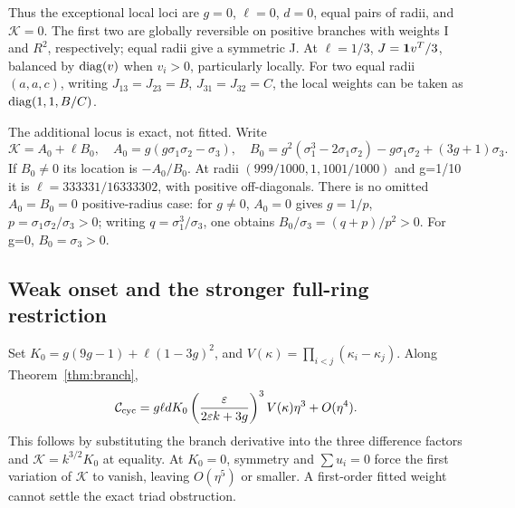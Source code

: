 Thus the exceptional local loci are \(g=0\), \(\ell=0\), \(d=0\), equal pairs of radii, and \(\mathcal K=0\). The first two are globally reversible on positive branches with weights I and \(R^2\), respectively; equal radii give a symmetric J. At \(\ell=1/3\), \(J=\mathbf1 v^T/3\), balanced by \(\operatorname{diag}(v)\) when \(v_i>0\), particularly locally. For two equal radii \((a,a,c)\), writing \(J_{13}=J_{23}=B\), \(J_{31}=J_{32}=C\), the local weights can be taken as \(\operatorname{diag}(1,1,B/C)\).

The additional locus is exact, not fitted. Write
\[
\mathcal K=A_0+\ell B_0,\quad A_0=g(g\sigma_1\sigma_2-\sigma_3),\quad
B_0=g^2(\sigma_1^3-2\sigma_1\sigma_2)-g\sigma_1\sigma_2+(3g+1)\sigma_3.
\]
If \(B_0\ne0\) its location is \(-A_0/B_0\). At radii \((999/1000,1,1001/1000)\) and g=1/10 it is \(\ell=333331/16333302\), with positive off-diagonals. There is no omitted \(A_0=B_0=0\) positive-radius case: for \(g\ne0\), \(A_0=0\) gives \(g=1/p\), \(p=\sigma_1\sigma_2/\sigma_3>0\); writing \(q=\sigma_1^3/\sigma_3\), one obtains \(B_0/\sigma_3=(q+p)/p^2>0\). For g=0, \(B_0=\sigma_3>0\).

\subsection{Weak onset and the stronger full-ring restriction}
Set \(K_0=g(9g-1)+\ell(1-3g)^2\), and \(V(\kappa)=\prod_{i<j}(\kappa_i-\kappa_j)\). Along Theorem~\ref{thm:branch},
\begin{equation}
\mathcal C_{\rm cyc}=
g\ell dK_0\left(\frac{\varepsilon}{2\varepsilon k+3g}\right)^3V(\kappa)\eta^3+O(\eta^4).\label{eq:cycleweak}
\end{equation}
This follows by substituting the branch derivative into the three difference factors and \(\mathcal K=k^{3/2}K_0\) at equality. At \(K_0=0\), symmetry and \(\sum u_i=0\) force the first variation of \(\mathcal K\) to vanish, leaving \(O(\eta^5)\) or smaller. A first-order fitted weight cannot settle the exact triad obstruction.

